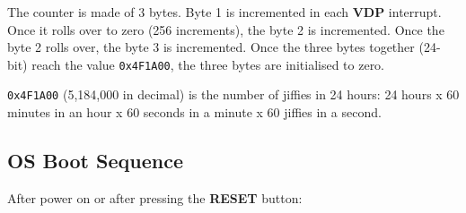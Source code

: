 \documentclass[a4paper,11pt]{article}
\begin{document}
    The counter is made of 3 bytes. Byte 1 is incremented in each \textbf{VDP}
    interrupt. Once it rolls over to zero (256 increments), the byte 2 is
    incremented. Once the byte 2 rolls over, the byte 3 is incremented. Once the
    three bytes together (24-bit) reach the value \texttt{0x4F1A00}, the three
    bytes are initialised to zero.

    \texttt{0x4F1A00} (5,184,000 in decimal) is the number of jiffies in 24
    hours: 24 hours x 60 minutes in an hour x 60 seconds in a minute x 60
    jiffies in a second.

    \subsection{OS Boot Sequence}
    After power on or after pressing the \textbf{RESET} button:
\end{document}

